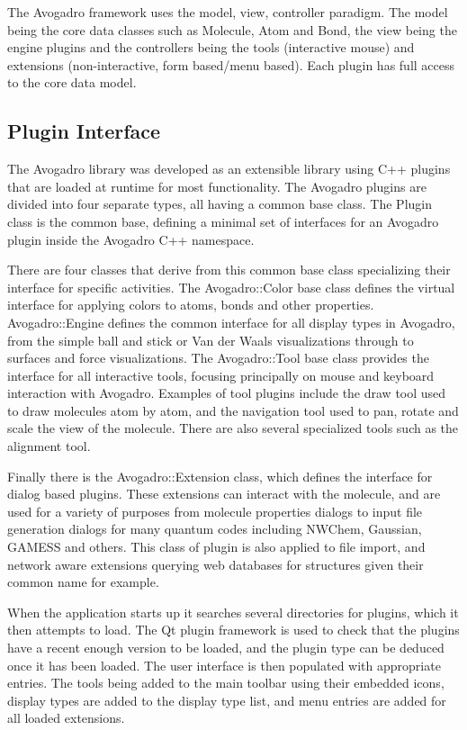 \documentclass[10pt]{bmc_article}
\newenvironment{bmcformat}{\begin{raggedright}
\baselineskip20pt\sloppy\setboolean{publ}{false}}{\end{raggedright}
\baselineskip20pt\sloppy}
\begin{document}
\begin{bmcformat}
The Avogadro framework uses the model, view, controller paradigm. The model
being the core data classes such as Molecule, Atom and Bond, the view being the
engine plugins and the controllers being the tools (interactive mouse) and
extensions (non-interactive, form based/menu based). Each plugin has full access
to the core data model.

\subsection{Plugin Interface}

The Avogadro library was developed as an extensible library using C++ plugins
that are loaded at runtime for most functionality. The Avogadro plugins are
divided into four separate types, all having a common base class. The Plugin
class is the common base, defining a minimal set of interfaces for an Avogadro
plugin inside the Avogadro C++ namespace.

There are four classes that derive from this common base class specializing
their interface for specific activities. The Avogadro::Color base class defines
the virtual interface for applying colors to atoms, bonds and other properties.
Avogadro::Engine defines the common interface for all display types in Avogadro,
from the simple ball and stick or Van der Waals visualizations through to
surfaces and force visualizations. The Avogadro::Tool base class provides
the interface for all interactive tools, focusing principally on mouse and
keyboard interaction with Avogadro. Examples of tool plugins include the draw
tool used to draw molecules atom by atom, and the navigation tool used to pan,
rotate and scale the view of the molecule. There are also several specialized
tools such as the alignment tool.

Finally there is the Avogadro::Extension class, which defines the interface for
dialog based plugins. These extensions can interact with the molecule, and are
used for a variety of purposes from molecule properties dialogs to input file
generation dialogs for many quantum codes including NWChem, Gaussian, GAMESS and
others. This class of plugin is also applied to file import, and network aware
extensions querying web databases for structures given their common name for
example.

When the application starts up it searches several directories for plugins,
which it then attempts to load. The Qt plugin framework is used to check that
the plugins have a recent enough version to be loaded, and the plugin type can
be deduced once it has been loaded. The user interface is then populated with
appropriate entries. The tools being added to the main toolbar using their
embedded icons, display types are added to the display type list, and menu
entries are added for all loaded extensions.


\end{bmcformat}
\end{document}
